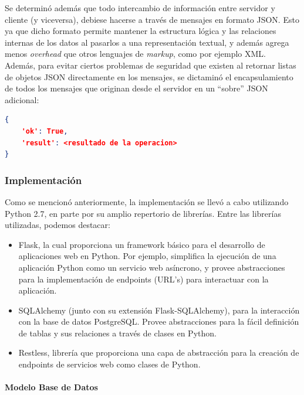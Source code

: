 \documentclass[11pt,letterpaper]{article}
\begin{document}
Se determinó además que todo intercambio de información entre servidor y cliente (y viceversa), debiese hacerse a través de mensajes en formato JSON. Esto ya que dicho formato permite mantener la estructura lógica y las relaciones internas de los datos al pasarlos a una representación textual, y además agrega menos \emph{overhead} que otros lenguajes de \emph{markup}, como por ejemplo XML.\\

Además, para evitar ciertos problemas de seguridad que existen al retornar listas de objetos JSON directamente en los mensajes, se dictaminó el encapsulamiento de todos los mensajes que originan desde el servidor en un ``sobre'' JSON adicional:

\begin{lstlisting}[language=json, title=Ejemplo de ``sobre'' JSON.]
{
    'ok': True,
    'result': <resultado de la operacion>
}
\end{lstlisting}

\subsubsection{Implementación}

Como se mencionó anteriormente, la implementación se llevó a cabo utilizando Python 2.7, en parte por su amplio repertorio de librerías. Entre las librerías utilizadas, podemos destacar:
\begin{itemize}
    \item Flask\cite{flask}, la cual proporciona un framework básico para el desarrollo de aplicaciones web en Python. Por ejemplo, simplifica la ejecución de una aplicación Python como un servicio web asíncrono, y provee abstracciones para la implementación de endpoints (URL's) para interactuar con la aplicación.
    \item SQLAlchemy\cite{sqlalchemy} (junto con su extensión Flask-SQLAlchemy\cite{flasksqlalchemy}), para la interacción con la base de datos PostgreSQL. Provee abstracciones para la fácil definición de tablas y sus relaciones a través de clases en Python.
    \item Restless\cite{restless}, librería que proporciona una capa de abstracción para la creación de endpoints de servicios web como clases de Python.
\end{itemize}

\paragraph{Modelo Base de Datos\\\\}
\end{document}

